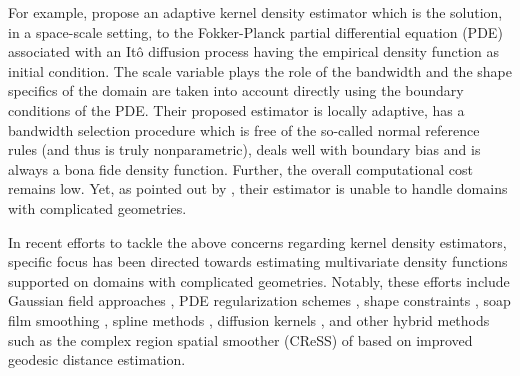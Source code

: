 \documentclass[bj,authoryear]{imsart}
\numberwithin{equation}{section}
\theoremstyle{plain}
\theoremstyle{remark}
\newcommand{\1}{\mathds{1}}
\begin{document}
    For example, \cite{BotevGrotowskiKroese2010} propose an adaptive kernel density estimator which is the solution, in a space-scale setting, to the Fokker-Planck partial differential equation (PDE) associated with an It\^o diffusion process having the empirical density function as initial condition. The scale variable plays the role of the bandwidth and the shape specifics of the domain are taken into account directly using the boundary conditions of the PDE. Their proposed estimator is locally adaptive, has a bandwidth selection procedure which is free of the so-called normal reference rules (and thus is truly nonparametric), deals well with boundary bias and is always a bona fide density function. Further, the overall computational cost remains low. Yet, as pointed out by \cite{Ferraccioli_et_al2021}, their estimator is unable to handle domains with complicated geometries.

    In recent efforts to tackle the above concerns regarding kernel density estimators, specific focus has been directed towards estimating multivariate density functions supported on domains with complicated geometries. Notably, these efforts include Gaussian field approaches \cite{LingrenRueLindstrom2011,Bakka_et_al2019,Niu_et_al2019}, PDE regularization schemes \cite{Azzimonti_et_al2014,Azzimonti_et_al2015,Sangalli2021,Ferraccioli_et_al2021,Arnone_et_al2022}, shape constraints \cite{Feng_et_al2021,XuSamworth2021}, soap film smoothing \cite{WoodBravingtonHedley2008}, spline methods \cite{Ramsay2002,WangRanalli2007,LaiSchumaker2007,GuillasLai2010,SangalliRansayRamsay2013,LaiWang2013,MillerWood2014,ZhouPan2014,Yu_et_al2021}, diffusion kernels \cite{BarryMcIntyre2011,McSwigganBaddeleyNair2017,McIntyreBarry2018,BarryMcIntyre2020}, and other hybrid methods such as the complex region spatial smoother (CReSS) of \cite{Scott-Hayward_et_al2015} based on improved geodesic distance estimation.
\end{document}
